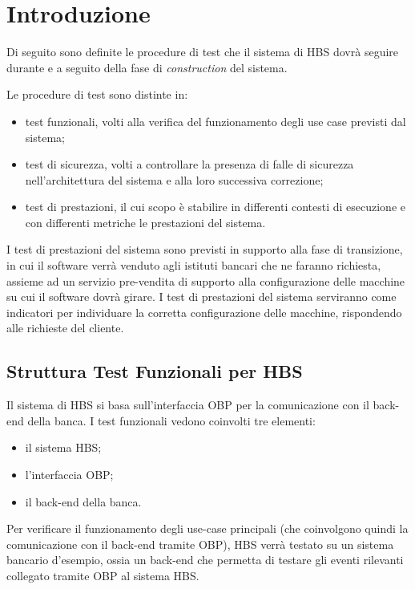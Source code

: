 
\section{Introduzione}

Di seguito sono definite le procedure di test che il sistema di HBS dovr\`a seguire durante e a seguito della fase di \emph{construction} del sistema.

Le procedure di test sono distinte in:
\begin{itemize}
	\item test funzionali, volti alla verifica del funzionamento degli use case previsti dal sistema;
	\item test di sicurezza, volti a controllare la presenza di falle di sicurezza nell'architettura del sistema e alla loro successiva correzione;
	\item test di prestazioni, il cui scopo \`e stabilire in differenti contesti di esecuzione e con differenti metriche le prestazioni del sistema.
\end{itemize}

I test di prestazioni del sistema sono previsti in supporto alla fase di transizione, in cui il software verr\`a venduto agli istituti bancari che ne faranno richiesta, assieme ad un servizio pre-vendita di supporto alla configurazione delle macchine su cui il software dovr\`a girare.
I test di prestazioni del sistema serviranno come indicatori per individuare la corretta configurazione delle macchine, rispondendo alle richieste del cliente.

\subsection{Struttura Test Funzionali per HBS}

Il sistema di HBS si basa sull'interfaccia OBP per la comunicazione con il back-end della banca.
I test funzionali vedono coinvolti tre elementi:
\begin{itemize}
	\item il sistema HBS;
	\item l'interfaccia OBP;
	\item il back-end della banca.
\end{itemize}
Per verificare il funzionamento degli use-case principali (che coinvolgono quindi la comunicazione con il back-end tramite OBP), HBS verr\`a testato su un sistema bancario d'esempio, ossia un back-end che permetta di testare gli eventi rilevanti collegato tramite OBP al sistema HBS.

